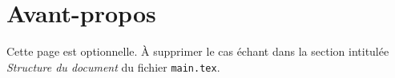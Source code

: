 \chapter*{Avant-propos}

\textcolor{eclipsepurple}{Cette page est optionnelle. À supprimer le cas échant dans la section intitulée \textit{Structure du document }du fichier \texttt{main.tex}}.

\lipsum[1] %
